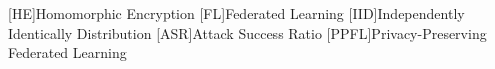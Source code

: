 \begin{acronym}
    [HE]{Homomorphic Encryption}
    [FL]{Federated Learning}
    [IID]{Independently Identically Distribution}
    [ASR]{Attack Success Ratio}
    [PPFL]{Privacy-Preserving Federated Learning}
\end{acronym}